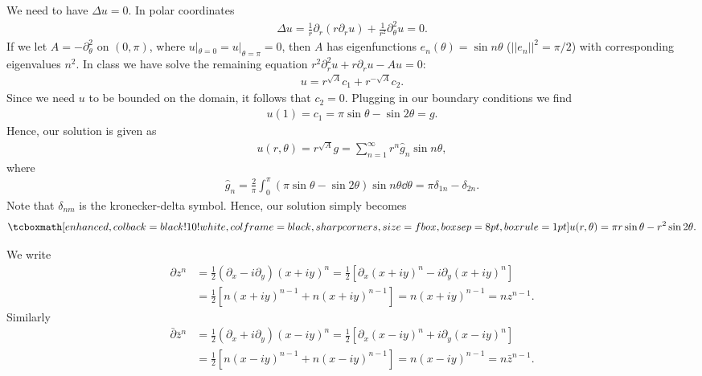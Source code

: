 
We need to have $\Delta u = 0$.
In polar coordinates
\begin{eqnarray}
    \label{eq:polar-lap}
    \Delta u = \frac{1}{r}\partial_{r}(r\partial_{r}u) + \frac{1}{r^2}\partial_{\theta}^2 u = 0
.\end{eqnarray}
If we let $A = -\partial_{\theta}^2$ on $(0,\pi)$, where $u|_{\theta=0} = u|_{\theta=\pi} = 0$, then $A$ has eigenfunctions $e_{n}(\theta) = \sin{n\theta}$ ($||e_{n}||^2 = \pi/2$) with corresponding eigenvalues $n^2$.
In class we have solve the remaining equation $r^2\partial_{r}^2 u + r\partial_{r} u - Au = 0$:
\begin{eqnarray}
    \label{eq:solve-harmonic-u-A}
    u = r^{\sqrt{A}}c_1 + r^{-\sqrt{A}}c_2
.\end{eqnarray}
Since we need $u$ to be bounded on the domain, it follows that $c_2 = 0$.
Plugging in our boundary conditions we find
\begin{eqnarray}
    \label{eq:bound-cond-r1}
    u(1) = c_1 = \pi\sin{\theta} - \sin{2\theta} = g
.\end{eqnarray}
Hence, our solution is given as
\begin{eqnarray}
    \label{eq:sol-u-g}
    u(r,\theta) =  r^{\sqrt{A}} g = \sum_{n=1}^{\infty} r^{n} \hat{g}_{n} \sin{n\theta}
,\end{eqnarray}
where
\begin{eqnarray}
    \label{eq:gnhat}
    \hat{g}_{n} = \frac{2}{\pi} \int_{0}^{\pi} (\pi\sin{\theta} - \sin{2\theta})\sin{n\theta} \dd{\theta} = \pi \delta_{1n} - \delta_{2n}
.\end{eqnarray}
Note that $\delta_{nm}$ is the kronecker-delta symbol.
Hence, our solution simply becomes
\begin{eqnarray}
    \label{eq:sol-u-simplify}
    \eqbox{
    u(r,\theta) = \pi r \sin{\theta} - r^2\sin{2\theta}
}
.\end{eqnarray}





We write
\begin{align}
    \label{eq:deriv-zn}
    \partial z^{n} &= \frac{1}{2} (\partial_{x} - i \partial_{y})(x + iy)^{n} = \frac{1}{2} [ \partial_{x}(x + iy)^{n} - i\partial_{y} (x + iy)^{n} ] \\
    &= \frac{1}{2}[n(x+iy)^{n-1} + n(x+iy)^{n-1}] = n (x+iy)^{n-1} = nz^{n-1}
.\end{align}
Similarly
\begin{align}
    \label{eq:deriv-zbarn}
    \bar{\partial} \bar{z}^{n} &= \frac{1}{2} (\partial_{x} + i \partial_{y})(x - iy)^{n} = \frac{1}{2} [ \partial_{x}(x - iy)^{n} + i\partial_{y} (x - iy)^{n} ] \\
    &= \frac{1}{2}[n(x-iy)^{n-1} + n(x-iy)^{n-1}] = n (x-iy)^{n-1} = n \bar{z}^{n-1}
.\end{align}


